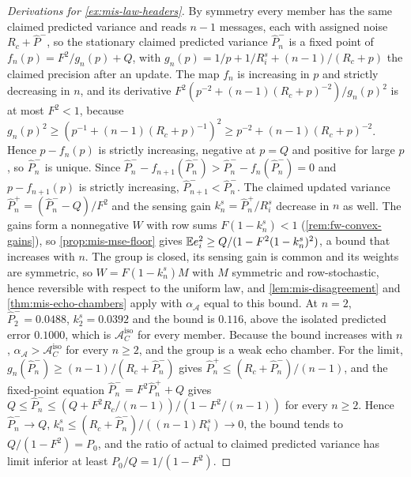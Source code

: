 \begin{proof}[Derivations for \cref{ex:mis-law-headers}]
By symmetry every member has the same claimed predicted variance and reads $n-1$ messages, each with assigned noise $R_c+\hat P^-$, so the stationary claimed predicted variance $\hat P^-_n$ is a fixed point of $f_n(p)=F^2/g_n(p)+Q$, with $g_n(p)=1/p+1/R^s_i+(n-1)/(R_c+p)$ the claimed precision after an update. The map $f_n$ is increasing in $p$ and strictly decreasing in $n$, and its derivative $F^2(p^{-2}+(n-1)(R_c+p)^{-2})/g_n(p)^2$ is at most $F^2<1$, because $g_n(p)^2\ge(p^{-1}+(n-1)(R_c+p)^{-1})^2\ge p^{-2}+(n-1)(R_c+p)^{-2}$. Hence $p-f_n(p)$ is strictly increasing, negative at $p=Q$ and positive for large $p$, so $\hat P^-_n$ is unique. Since $\hat P^-_n-f_{n+1}(\hat P^-_n)>\hat P^-_n-f_n(\hat P^-_n)=0$ and $p-f_{n+1}(p)$ is strictly increasing, $\hat P^-_{n+1}<\hat P^-_n$. The claimed updated variance $\hat P^+_n=(\hat P^-_n-Q)/F^2$ and the sensing gain $k^s_n=\hat P^+_n/R^s_i$ decrease in $n$ as well. The gains form a nonnegative $W$ with row sums $F(1-k^s_n)<1$ (\cref{rem:fw-convex-gains}), so \cref{prop:mis-mse-floor} gives $\mathbb{E} e_i^2\ge Q/(1-F^2(1-k^s_n)^2)$, a bound that increases with $n$. The group is closed, its sensing gain is common and its weights are symmetric, so $W=F(1-k^s_n)M$ with $M$ symmetric and row-stochastic, hence reversible with respect to the uniform law, and \cref{lem:mis-disagreement} and \cref{thm:mis-echo-chambers} apply with $\alpha_{\mathcal A}$ equal to this bound. At $n=2$, $\hat P^-_2=0.0488$, $k^s_2=0.0392$ and the bound is $0.116$, above the isolated predicted error $0.1000$, which is $\mathcal A^{\mathrm{iso}}_C$ for every member. Because the bound increases with $n$, $\alpha_{\mathcal A}>\mathcal A^{\mathrm{iso}}_C$ for every $n\ge2$, and the group is a weak echo chamber. For the limit, $g_n(\hat P^-_n)\ge(n-1)/(R_c+\hat P^-_n)$ gives $\hat P^+_n\le(R_c+\hat P^-_n)/(n-1)$, and the fixed-point equation $\hat P^-_n=F^2\hat P^+_n+Q$ gives $Q\le\hat P^-_n\le(Q+F^2R_c/(n-1))/(1-F^2/(n-1))$ for every $n\ge2$. Hence $\hat P^-_n\to Q$, $k^s_n\le(R_c+\hat P^-_n)/((n-1)R^s_i)\to0$, the bound tends to $Q/(1-F^2)=P_0$, and the ratio of actual to claimed predicted variance has limit inferior at least $P_0/Q=1/(1-F^2)$.
\end{proof}


